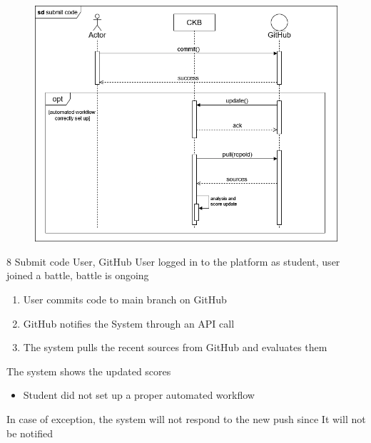 \usecase
{
    {
    \begin{figure}[H]
        \centering
        \includegraphics[width=\textwidth]{src/sequence_diagrams/submitcode.png}
    \end{figure}
}
}
{8}
{Submit code} %
{User, GitHub} %
{User logged in to the platform as student, user joined a battle, battle is ongoing} %
{ %
    \begin{enumerate}
        \item User commits code to main branch on GitHub
        \item GitHub notifies the System through an API call
        \item The system pulls the recent sources from GitHub and evaluates them
    \end{enumerate}
}
{The system shows the updated scores} %
{ %
    \begin{itemize}
        \item Student did not set up a proper automated workflow
    \end{itemize}
}
{ %
In case of exception, the system will not respond to the new push since It will not be notified
}

